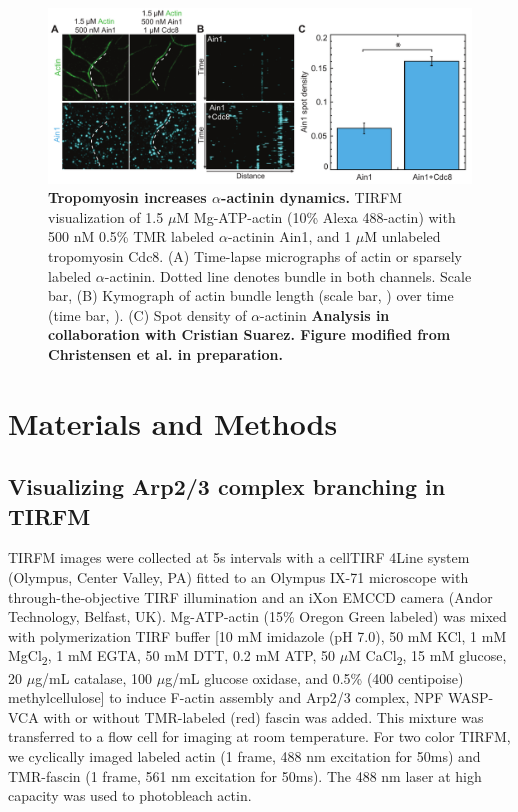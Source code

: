 \begin{figure}
\centering
\includegraphics[width=\textwidth]{img/ch03/Thesis_aact_dynamics.pdf}
\caption[Tropomyosin increases \texorpdfstring{$\alpha$}{alpha}-actinin dynamics.]{\textbf{Tropomyosin increases $\alpha$-actinin dynamics.} TIRFM visualization of 1.5 $\mu$M Mg-ATP-actin (10\% Alexa 488-actin) with 500 nM 0.5\% TMR labeled $\alpha$-actinin Ain1, and 1 $\mu$M unlabeled tropomyosin Cdc8. (A) Time-lapse micrographs of actin or sparsely labeled $\alpha$-actinin. Dotted line denotes bundle in both channels. Scale bar, (B) Kymograph of actin bundle length (scale bar, ) over time (time bar, ). (C) Spot density of $\alpha$-actinin \textbf{Analysis in collaboration with Cristian Suarez. Figure modified from Christensen et al. in preparation.}}
\label{fig:tropo_aact}
\end{figure}

\section{Materials and Methods}\label{bundlers-matmeth}

\subsection{Visualizing Arp2/3 complex branching in TIRFM}
TIRFM images were collected at 5s intervals with a cellTIRF 4Line system (Olympus, Center Valley, PA) fitted to an Olympus IX-71 microscope with through-the-objective TIRF illumination and an iXon EMCCD camera (Andor Technology, Belfast, UK). Mg-ATP-actin (15\% Oregon Green labeled) was mixed with polymerization TIRF buffer [10 mM imidazole (pH 7.0), 50 mM KCl, 1 mM MgCl\textsubscript{2}, 1 mM EGTA, 50 mM DTT, 0.2 mM ATP, 50 $\mu$M CaCl\textsubscript{2}, 15 mM glucose, 20 $\mu$g/mL catalase, 100 $\mu$g/mL glucose oxidase, and 0.5\% (400 centipoise) methylcellulose] to induce F-actin assembly and Arp2/3 complex, NPF WASP-VCA with or without TMR-labeled (red) fascin was added. This mixture was transferred to a flow cell for imaging at room temperature. For two color TIRFM, we cyclically imaged labeled actin (1 frame, 488 nm excitation for 50ms) and TMR-fascin (1 frame, 561 nm excitation for 50ms). The 488 nm laser at high capacity was used to photobleach actin. 

